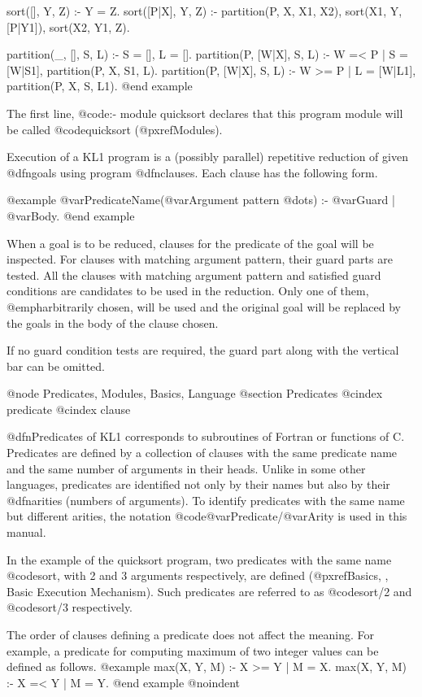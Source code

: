 sort([], Y, Z) :- Y = Z.
sort([P|X], Y, Z) :-
    partition(P, X, X1, X2),
    sort(X1, Y, [P|Y1]),
    sort(X2, Y1, Z).

partition(_, [], S, L) :-
    S = [],
    L = [].
partition(P, [W|X], S, L) :- W =< P |
    S = [W|S1],
    partition(P, X, S1, L).
partition(P, [W|X], S, L) :- W >= P |
    L = [W|L1],
    partition(P, X, S, L1).
@end example

The first line, @code{:- module quicksort} declares that this program module
will be called @code{quicksort} (@pxref{Modules}).

Execution of a KL1 program is a (possibly parallel) repetitive reduction
of given @dfn{goals} using program @dfn{clauses}.  Each clause has the
following form.

@example
@var{PredicateName}(@var{Argument pattern} @dots{}) :- @var{Guard} | @var{Body}.
@end example

When a goal is to be reduced, clauses for the predicate of the goal will
be inspected.  For clauses with matching argument pattern, their guard
parts are tested.  All the clauses with matching argument pattern and
satisfied guard conditions are candidates to be used in the reduction.
Only one of them, @emph{arbitrarily chosen,} will be used and the
original goal will be replaced by the goals in the body of the clause
chosen.

If no guard condition tests are required, the guard part along with
the vertical bar can be omitted.

@node Predicates, Modules, Basics, Language
@section Predicates
@cindex predicate
@cindex clause

@dfn{Predicates} of KL1 corresponds to subroutines of Fortran or
functions of C.  Predicates are defined by a collection of clauses with
the same predicate name and the same number of arguments in their heads.
Unlike in some other languages, predicates are identified not only by
their names but also by their @dfn{arities} (numbers of arguments).  To
identify predicates with the same name but different arities, the
notation @code{@var{Predicate}/@var{Arity}} is used in this manual.

In the example of the quicksort program, two predicates with the same
name @code{sort}, with 2 and 3 arguments respectively, are defined
(@pxref{Basics, , Basic Execution Mechanism}).  Such predicates are
referred to as @code{sort/2} and @code{sort/3} respectively.

The order of clauses defining a predicate does not affect the meaning.
For example, a predicate for computing maximum of two integer values can
be defined as follows.
@example
max(X, Y, M) :- X >= Y | M = X.
max(X, Y, M) :- X =< Y | M = Y.
@end example
@noindent

